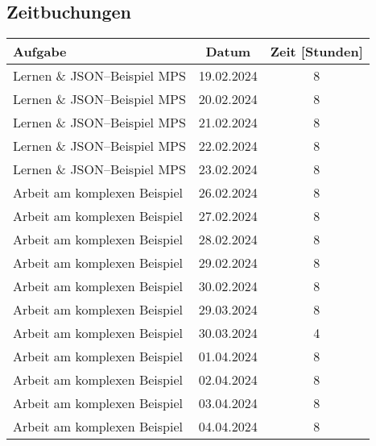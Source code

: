 \subsection{Zeitbuchungen}\label{appendix:zeitbuchungen}
\begin{table}[H]
    \centering
    \begin{tabular}{|l|c|c|}
        \hline
        Aufgabe                                & Datum      & Zeit [Stunden] \\
        \hline
        \hline
        Lernen \& \ac{JSON}--Beispiel \ac{MPS} & 19.02.2024 & 8              \\
        \hline
        Lernen \& \ac{JSON}--Beispiel \ac{MPS} & 20.02.2024 & 8              \\
        \hline
        Lernen \& \ac{JSON}--Beispiel \ac{MPS} & 21.02.2024 & 8              \\
        \hline
        Lernen \& \ac{JSON}--Beispiel \ac{MPS} & 22.02.2024 & 8              \\
        \hline
        Lernen \& \ac{JSON}--Beispiel \ac{MPS} & 23.02.2024 & 8              \\
        \hline
        Arbeit am komplexen Beispiel           & 26.02.2024 & 8              \\
        \hline
        Arbeit am komplexen Beispiel           & 27.02.2024 & 8              \\
        \hline
        Arbeit am komplexen Beispiel           & 28.02.2024 & 8              \\
        \hline
        Arbeit am komplexen Beispiel           & 29.02.2024 & 8              \\
        \hline
        Arbeit am komplexen Beispiel           & 30.02.2024 & 8              \\
        \hline
        Arbeit am komplexen Beispiel           & 29.03.2024 & 8              \\
        \hline
        Arbeit am komplexen Beispiel           & 30.03.2024 & 4              \\
        \hline
        Arbeit am komplexen Beispiel           & 01.04.2024 & 8              \\
        \hline
        Arbeit am komplexen Beispiel           & 02.04.2024 & 8              \\
        \hline
        Arbeit am komplexen Beispiel           & 03.04.2024 & 8              \\
        \hline
        Arbeit am komplexen Beispiel           & 04.04.2024 & 8              \\

\end{tabular}
\end{table}
